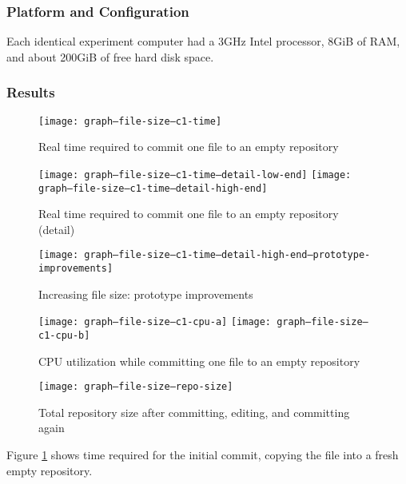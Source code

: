\documentclass[a4paper]{article}
\begin{document}
\subsubsection{Platform and Configuration}

Each identical experiment computer had a 3GHz Intel processor, 8GiB of RAM, and
about 200GiB of free hard disk space.

\fi

\subsubsection{Results}

\begin{figure}[p]
  \caption{Real time required to commit one file to an empty repository}
  \label{fig:graph--file-size--c1-time}
  \centering
    \texttt{[image: graph--file-size--c1-time]}
\end{figure}

\begin{figure}[p]
  \caption{Real time required to commit one file to an empty repository (detail)}
  \label{fig:graph--file-size--c1-time--detail-high-end}
  \centering
    \texttt{[image: graph--file-size--c1-time--detail-low-end]}
    \texttt{[image: graph--file-size--c1-time--detail-high-end]}
\end{figure}

\begin{figure}[p]
  \caption{Increasing file size: prototype improvements}
  \label{fig:graph--file-size--c1-time--prototype-improvements}
  \centering
    \texttt{[image: graph--file-size--c1-time--detail-high-end--prototype-improvements]}
\end{figure}

\begin{figure}[p]
  \caption{CPU utilization while committing one file to an empty repository}
  \label{fig:graph--file-size--c1-cpu}
  \centering
    \texttt{[image: graph--file-size--c1-cpu-a]}
    \texttt{[image: graph--file-size--c1-cpu-b]}
\end{figure}

\begin{figure}[p]
  \caption{Total repository size after committing, editing, and committing again}
  \label{fig:graph--file-size--repo-size}
  \centering
    \texttt{[image: graph--file-size--repo-size]}
\end{figure}

Figure \ref{fig:graph--file-size--c1-time} shows time required for
the initial commit, copying the file into a fresh empty repository.
\end{document}
